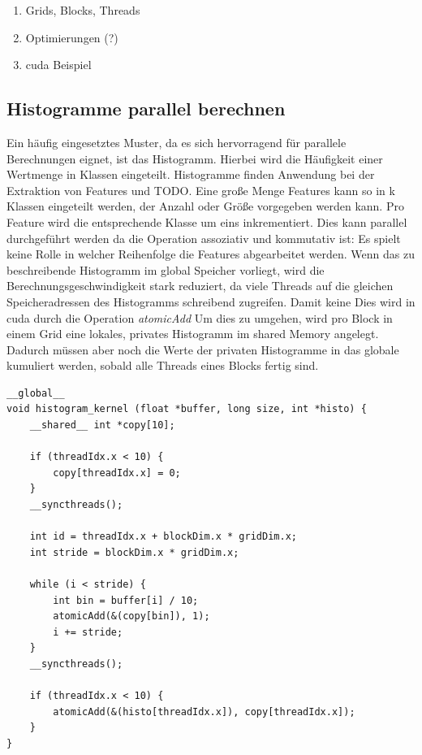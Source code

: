 \begin{enumerate}
	\item Grids, Blocks, Threads
	\item Optimierungen (?)
	\item cuda Beispiel
\end{enumerate}

\subsection{Histogramme parallel berechnen}

Ein häufig eingesetztes Muster, da es sich hervorragend  für parallele Berechnungen eignet, ist das Histogramm. Hierbei wird die Häufigkeit einer Wertmenge in Klassen eingeteilt. Histogramme finden Anwendung bei der Extraktion von Features und TODO. Eine große Menge Features kann so in k Klassen eingeteilt werden, der Anzahl oder Größe vorgegeben werden kann. Pro Feature wird die entsprechende Klasse um eins inkrementiert. Dies kann parallel durchgeführt werden da die Operation assoziativ und kommutativ ist: Es spielt keine Rolle in welcher Reihenfolge die Features abgearbeitet werden. Wenn das zu beschreibende Histogramm im global Speicher vorliegt, wird die Berechnungsgeschwindigkeit stark reduziert, da viele Threads auf die gleichen Speicheradressen des Histogramms schreibend zugreifen. Damit keine Dies wird in cuda durch die Operation \textit{atomicAdd} Um dies zu umgehen, wird pro Block in einem Grid eine lokales, privates Histogramm im shared Memory angelegt. Dadurch müssen aber noch die Werte der privaten Histogramme in das globale kumuliert werden, sobald alle Threads eines Blocks fertig sind.

\lstset{language=C}
\begin{lstlisting}
__global__
void histogram_kernel (float *buffer, long size, int *histo) {
	__shared__ int *copy[10];
	
	if (threadIdx.x < 10) {
		copy[threadIdx.x] = 0;		
	}
	__syncthreads();

	int id = threadIdx.x + blockDim.x * gridDim.x;
	int stride = blockDim.x * gridDim.x;
	
	while (i < stride) {
		int bin = buffer[i] / 10; 
		atomicAdd(&(copy[bin]), 1);
		i += stride;	
	}
	__syncthreads();
	
	if (threadIdx.x < 10) {
		atomicAdd(&(histo[threadIdx.x]), copy[threadIdx.x]);		
	}
}
\end{lstlisting} 